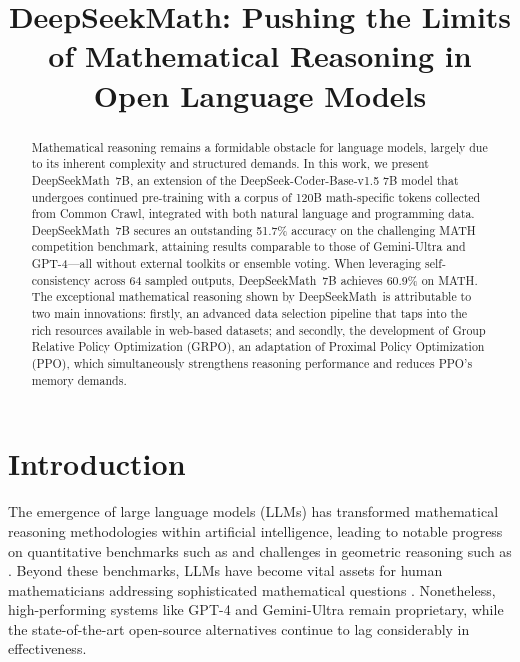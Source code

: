 \title{DeepSeekMath: Pushing the Limits of Mathematical Reasoning in Open Language Models}

\begin{abstract}
Mathematical reasoning remains a formidable obstacle for language models, largely due to its inherent complexity and structured demands. In this work, we present DeepSeekMath~7B, an extension of the DeepSeek-Coder-Base-v1.5 7B model that undergoes continued pre-training with a corpus of 120B math-specific tokens collected from Common Crawl, integrated with both natural language and programming data. DeepSeekMath~7B secures an outstanding 51.7\% accuracy on the challenging MATH competition benchmark, attaining results comparable to those of Gemini-Ultra and GPT-4—all without external toolkits or ensemble voting. When leveraging self-consistency across 64 sampled outputs, DeepSeekMath~7B achieves 60.9\% on MATH. The exceptional mathematical reasoning shown by DeepSeekMath~is attributable to two main innovations: firstly, an advanced data selection pipeline that taps into the rich resources available in web-based datasets; and secondly, the development of Group Relative Policy Optimization (GRPO), an adaptation of Proximal Policy Optimization (PPO), which simultaneously strengthens reasoning performance and reduces PPO's memory demands.
\end{abstract}

\section{Introduction}

The emergence of large language models (LLMs) has transformed mathematical reasoning methodologies within artificial intelligence, leading to notable progress on quantitative benchmarks such as \citep{MATH} and challenges in geometric reasoning such as \citep{trinh2024solving}. Beyond these benchmarks, LLMs have become vital assets for human mathematicians addressing sophisticated mathematical questions \citep{tao}. Nonetheless, high-performing systems like GPT-4 \citep{gpt4} and Gemini-Ultra \citep{gemini} remain proprietary, while the state-of-the-art open-source alternatives continue to lag considerably in effectiveness.

